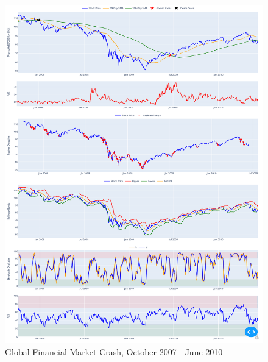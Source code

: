 \documentclass[conference]{IEEEtran}
\begin{document}
\begin{figure}[h]
    \centering
    \includegraphics[width=\textwidth]{Figure_03.png}
    \caption{Global Financial Market Crash, October 2007 - June 2010}
    \label{fig:fig3}
\end{figure}
\end{document}
